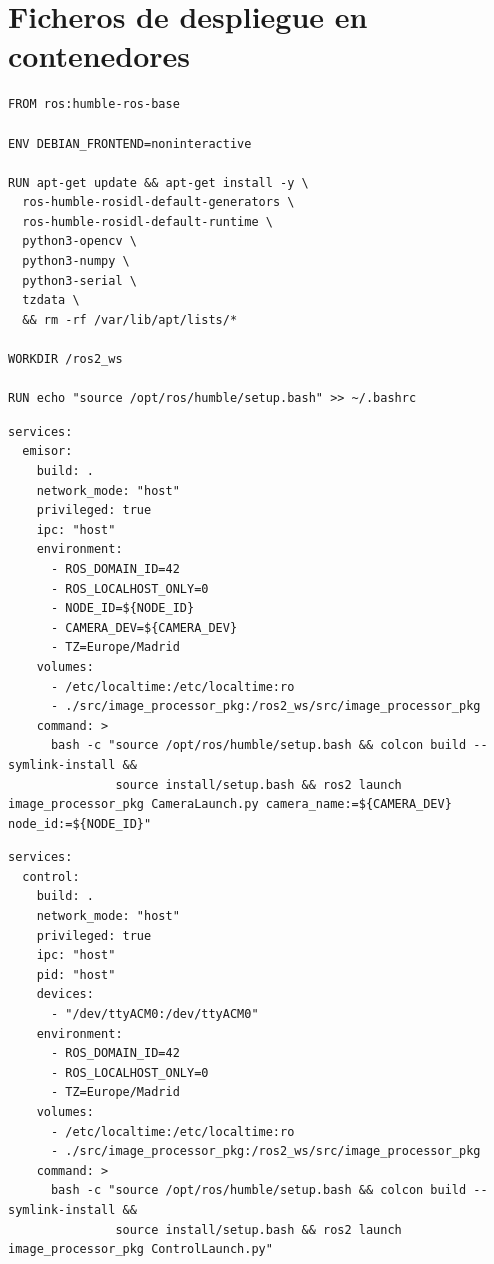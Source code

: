 \section{Ficheros de despliegue en contenedores}
\label{sec:anexo-compose}

\begin{lstlisting}[style=codigo, language=yamlsimple, caption={\texttt{Dockerfile}}, label={lst:dockerfile}]
FROM ros:humble-ros-base

ENV DEBIAN_FRONTEND=noninteractive

RUN apt-get update && apt-get install -y \
  ros-humble-rosidl-default-generators \
  ros-humble-rosidl-default-runtime \
  python3-opencv \
  python3-numpy \
  python3-serial \
  tzdata \
  && rm -rf /var/lib/apt/lists/*

WORKDIR /ros2_ws

RUN echo "source /opt/ros/humble/setup.bash" >> ~/.bashrc
\end{lstlisting}

\begin{lstlisting}[style=codigo, language=yamlsimple, caption={[Fichero de Docker Compose para levantar un nodo cámara]Fichero de Docker Compose para levantar un nodo cámara (\texttt{docker-compose-camera.yml})}, label={lst:compose-camera}]
services:
  emisor:
    build: .
    network_mode: "host"
    privileged: true
    ipc: "host"
    environment:
      - ROS_DOMAIN_ID=42
      - ROS_LOCALHOST_ONLY=0
      - NODE_ID=${NODE_ID}
      - CAMERA_DEV=${CAMERA_DEV}
      - TZ=Europe/Madrid
    volumes:
      - /etc/localtime:/etc/localtime:ro
      - ./src/image_processor_pkg:/ros2_ws/src/image_processor_pkg
    command: >
      bash -c "source /opt/ros/humble/setup.bash && colcon build --symlink-install &&
               source install/setup.bash && ros2 launch image_processor_pkg CameraLaunch.py camera_name:=${CAMERA_DEV} node_id:=${NODE_ID}"
\end{lstlisting}

\begin{lstlisting}[style=codigo, language=yamlsimple, caption={[Fichero de Docker Compose para levantar los nodos controladores y el nodo de potencia]Fichero de Docker Compose para levantar los nodos controladores y el nodo de potencia (\texttt{docker-compose-control.yml})}, label={lst:compose-control}]
services:
  control:
    build: .
    network_mode: "host"
    privileged: true
    ipc: "host"
    pid: "host"
    devices:
      - "/dev/ttyACM0:/dev/ttyACM0"
    environment:
      - ROS_DOMAIN_ID=42
      - ROS_LOCALHOST_ONLY=0
      - TZ=Europe/Madrid
    volumes:
      - /etc/localtime:/etc/localtime:ro
      - ./src/image_processor_pkg:/ros2_ws/src/image_processor_pkg
    command: >
      bash -c "source /opt/ros/humble/setup.bash && colcon build --symlink-install &&
               source install/setup.bash && ros2 launch image_processor_pkg ControlLaunch.py"
\end{lstlisting}

